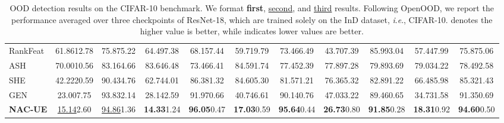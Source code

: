\documentclass{article} \usepackage{iclr2024_conference,times}
\newcommand{\ie}{\textit{i}.\textit{e}.}
\begin{document}
\begin{table*}[h]
{\begin{tabular}{l cc cc cc cc cc}
			RankFeat & 61.86{\tiny12.78} & 75.87{\tiny5.22} & 64.49{\tiny7.38} & 68.15{\tiny7.44} & 59.71{\tiny9.79} & 73.46{\tiny6.49} & 43.70{\tiny7.39} & 85.99{\tiny3.04} & 57.44{\tiny7.99} & 75.87{\tiny5.06} \\ 
			ASH & 70.00{\tiny10.56} & 83.16{\tiny4.66} & 83.64{\tiny6.48} & 73.46{\tiny6.41} & 84.59{\tiny1.74} & 77.45{\tiny2.39} & 77.89{\tiny7.28} & 79.89{\tiny3.69} & 79.03{\tiny4.22} & 78.49{\tiny2.58} \\ 
			SHE & 42.22{\tiny20.59} & 90.43{\tiny4.76} & 62.74{\tiny4.01} & 86.38{\tiny1.32} & 84.60{\tiny5.30} & 81.57{\tiny1.21} & 76.36{\tiny5.32} & 82.89{\tiny1.22} & 66.48{\tiny5.98} & 85.32{\tiny1.43} \\ 
			GEN & 23.00{\tiny7.75} & 93.83{\tiny2.14} & 28.14{\tiny2.59} & 91.97{\tiny0.66} & 40.74{\tiny6.61} & 90.14{\tiny0.76} & 47.03{\tiny3.22} & 89.46{\tiny0.65} & 34.73{\tiny1.58} & 91.35{\tiny0.69} \\ 
			\rowcolor{LightGray}
			\textbf{NAC-UE} & \underline{15.14}{\tiny2.60}  & \underline{94.86}{\tiny1.36}  & \textbf{14.33}{\tiny1.24}  & \textbf{96.05}{\tiny0.47}  & \textbf{17.03}{\tiny0.59}  & \textbf{95.64}{\tiny0.44}  & \textbf{26.73}{\tiny0.80}  &  \textbf{91.85}{\tiny0.28}  & \textbf{18.31}{\tiny0.92} &  \textbf{94.60}{\tiny0.50} \\ 
			\bottomrule
		\end{tabular}
		
	}
	\caption{OOD detection results on the CIFAR-10 benchmark. We format \textbf{first}, \underline{second}, and \underline{third} results. 
	Following OpenOOD, we report the performance averaged over three checkpoints of ResNet-18, which are trained solely on the InD dataset, \ie, CIFAR-10.  denotes the higher value is better, while  indicates lower values are better. }
	\label{Appendix:Tab:Full_OOD_Detection_CiFAR10}
	\vspace{-2mm}
\end{table*}
\end{document}
